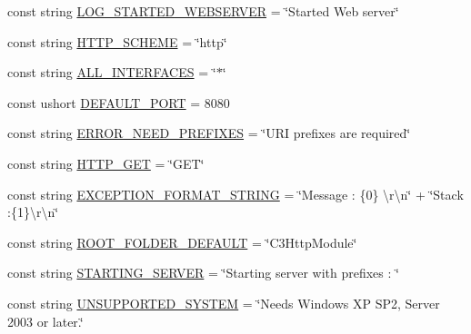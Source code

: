 \begin{DoxyCompactItemize}
\item 
const string \mbox{\hyperlink{class_concord_1_1_c3_http_module_1_1_constants_aa9a8451889ca458610a474d8824cbba5}{L\+O\+G\+\_\+\+S\+T\+A\+R\+T\+E\+D\+\_\+\+W\+E\+B\+S\+E\+R\+V\+ER}} = \char`\"{}Started Web server\char`\"{}
\item 
const string \mbox{\hyperlink{class_concord_1_1_c3_http_module_1_1_constants_ad5d0cf769b25bef58e712036c67b915b}{H\+T\+T\+P\+\_\+\+S\+C\+H\+E\+ME}} = \char`\"{}http\char`\"{}
\item 
const string \mbox{\hyperlink{class_concord_1_1_c3_http_module_1_1_constants_a3fe72e8bc32c96064538c8af8199c478}{A\+L\+L\+\_\+\+I\+N\+T\+E\+R\+F\+A\+C\+ES}} = \char`\"{}$\ast$\char`\"{}
\item 
const ushort \mbox{\hyperlink{class_concord_1_1_c3_http_module_1_1_constants_a4790c1697961574b369f80040d3fa9da}{D\+E\+F\+A\+U\+L\+T\+\_\+\+P\+O\+RT}} = 8080
\item 
const string \mbox{\hyperlink{class_concord_1_1_c3_http_module_1_1_constants_a771df9956472c8100948a563e5b0f7cb}{E\+R\+R\+O\+R\+\_\+\+N\+E\+E\+D\+\_\+\+P\+R\+E\+F\+I\+X\+ES}} = \char`\"{}U\+RI prefixes are required\char`\"{}
\item 
const string \mbox{\hyperlink{class_concord_1_1_c3_http_module_1_1_constants_a7f3f72731ac848064ca8d36e91369143}{H\+T\+T\+P\+\_\+\+G\+ET}} = \char`\"{}G\+ET\char`\"{}
\item 
const string \mbox{\hyperlink{class_concord_1_1_c3_http_module_1_1_constants_a7b6aed72af3256e1fce0da27a30c3120}{E\+X\+C\+E\+P\+T\+I\+O\+N\+\_\+\+F\+O\+R\+M\+A\+T\+\_\+\+S\+T\+R\+I\+NG}} = \char`\"{}Message \+: \{0\} \textbackslash{}r\textbackslash{}n\char`\"{} + \char`\"{}Stack \+:\{1\}\textbackslash{}r\textbackslash{}n\char`\"{}
\item 
const string \mbox{\hyperlink{class_concord_1_1_c3_http_module_1_1_constants_a05651f7e359dac80c6e17752c9a2924b}{R\+O\+O\+T\+\_\+\+F\+O\+L\+D\+E\+R\+\_\+\+D\+E\+F\+A\+U\+LT}} = \char`\"{}C3\+Http\+Module\char`\"{}
\item 
const string \mbox{\hyperlink{class_concord_1_1_c3_http_module_1_1_constants_afa1e2f46fa6065fa01f5ee512fa45bda}{S\+T\+A\+R\+T\+I\+N\+G\+\_\+\+S\+E\+R\+V\+ER}} = \char`\"{}Starting server with prefixes \+: \char`\"{}
\item 
const string \mbox{\hyperlink{class_concord_1_1_c3_http_module_1_1_constants_aa5edf6e785a3b92128ad2d81b77c583e}{U\+N\+S\+U\+P\+P\+O\+R\+T\+E\+D\+\_\+\+S\+Y\+S\+T\+EM}} = \char`\"{}Needs Windows XP S\+P2, Server 2003 or later.\char`\"{}
\item 

\end{DoxyCompactItemize}
